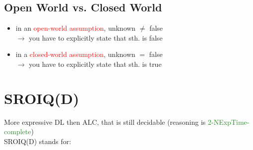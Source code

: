 \documentclass[12pt,a4paper]{article}
\newcommand{\red}[1]{\textcolor{red} {#1}}
\newcommand{\green}[1]{\textcolor{ForestGreen} {#1}}
\newcommand{\ra}{$\rightarrow$ }
\begin{document}
\subsection{Open World vs. Closed World}
\begin{itemize}
\item in an \red{open-world assumption}, unknown $\neq$ false\\\ra you have to explicitly state that sth. is false
\item in a \red{closed-world assumption}, unknown $=$ false\\\ra you have to explicitly state that sth. is true
\end{itemize}

\section{SROIQ(D)}
More expressive DL then ALC, that is still decidable (reasoning is \green{2-NExpTime-complete})\\
SROIQ(D) stands for:
\end{document}
